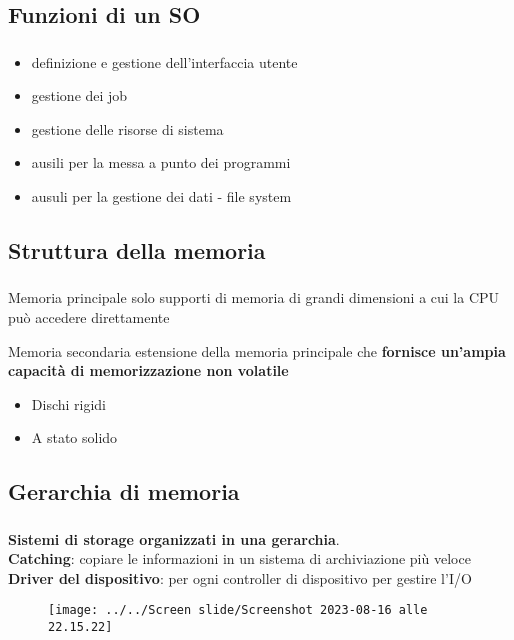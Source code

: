 \documentclass{beamer}
\newenvironment{mainframe}{
	\begin{frame}
		\frametitle{\insertsubsection}
		\framesubtitle{\insertsection}
	}{
	\end{frame}
}
\begin{document}
\subsection{Funzioni di un SO}
\begin{mainframe}
	\begin{itemize}
		\item definizione e gestione dell'interfaccia utente
		\item gestione dei job
		\item gestione delle risorse di sistema
		\item ausili per la messa a punto dei programmi
		\item ausuli per la gestione dei dati - file system
	\end{itemize}
\end{mainframe}
\subsection{Struttura della memoria}
\begin{mainframe}
	\begin{block}{Memoria principale}
		solo supporti di memoria di grandi dimensioni a cui la CPU può accedere direttamente
	\end{block}
	\begin{block}{Memoria secondaria}
		estensione della memoria principale che \textbf{fornisce un'ampia capacità di memorizzazione non volatile}
		\begin{itemize}
			\item Dischi rigidi
			\item A stato solido
		\end{itemize}
	\end{block}
\end{mainframe}
\subsection{Gerarchia di memoria}
\begin{mainframe}
	\textbf{Sistemi di storage organizzati in una gerarchia}.\\
	\textbf{Catching}: copiare le informazioni in un sistema di archiviazione più veloce\\
	\textbf{Driver del dispositivo}: per ogni controller di dispositivo per gestire l'I/O
	\begin{figure}
		\centering
		\texttt{[image: ../../Screen slide/Screenshot 2023-08-16 alle 22.15.22]}
	\end{figure}
\end{mainframe}
\end{document}
